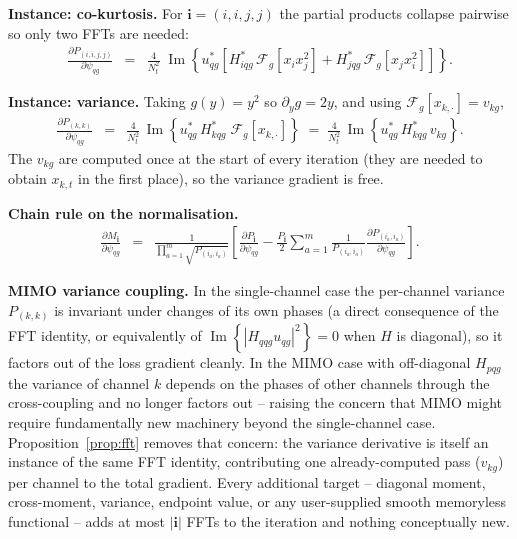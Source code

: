 \documentclass[10pt,a4paper]{article}
\numberwithin{equation}{section}
\newcommand{\block}[1]{\left[#1\right]}
\newcommand{\mat}[1]{\left(#1\right)}
\newcommand{\im}[1]{\operatorname{Im}\left\{#1\right\}}
\begin{document}
\textbf{Instance: co-kurtosis.} For $\mathbf{i}=(i,i,j,j)$ the partial products collapse pairwise so only two FFTs are needed:
\begin{eqnarray}
\frac{\partial P_{(i,i,j,j)}}{\partial \psi_{q g}} &=& \frac{4}{N_t^2}\;\im{u_{q g}^*\block{H_{i q g}^*\,\mathcal{F}_g\block{x_i x_j^2} + H_{j q g}^*\,\mathcal{F}_g\block{x_j x_i^2}}}.
\end{eqnarray}

\textbf{Instance: variance.} Taking $g\mat{y} = y^2$ so $\partial_y g = 2 y$, and using $\mathcal{F}_g\block{x_{k,\cdot}} = v_{k g}$,
\begin{eqnarray}
\frac{\partial P_{(k,k)}}{\partial \psi_{q g}}
	&=& \frac{4}{N_t^2}\,\im{u_{q g}^*\, H_{k q g}^*\;\mathcal{F}_g\block{x_{k,\cdot}}}
	\;=\; \frac{4}{N_t^2}\,\im{u_{q g}^*\, H_{k q g}^*\, v_{k g}}.
\end{eqnarray}
The $v_{k g}$ are computed once at the start of every iteration (they are needed to obtain $x_{k,t}$ in the first place), so the variance gradient is free.

\textbf{Chain rule on the normalisation.}
\begin{eqnarray}
\frac{\partial M_\mathbf{i}}{\partial \psi_{q g}}
	&=& \frac{1}{\prod_{a=1}^{m}\sqrt{P_{(i_a,i_a)}}}
	\block{\frac{\partial P_\mathbf{i}}{\partial \psi_{q g}}
	- \frac{P_\mathbf{i}}{2}\sum_{a=1}^{m}\frac{1}{P_{(i_a,i_a)}}\frac{\partial P_{(i_a,i_a)}}{\partial \psi_{q g}}}.
\end{eqnarray}

\textbf{MIMO variance coupling.} In the single-channel case the per-channel variance $P_{(k,k)}$ is invariant under changes of its own phases (a direct consequence of the FFT identity, or equivalently of $\im{|H_{q q g}u_{q g}|^2}=0$ when $H$ is diagonal), so it factors out of the loss gradient cleanly. In the MIMO case with off-diagonal $H_{p q g}$ the variance of channel $k$ depends on the phases of other channels through the cross-coupling and no longer factors out -- raising the concern that MIMO might require fundamentally new machinery beyond the single-channel case. Proposition~\ref{prop:fft} removes that concern: the variance derivative is itself an instance of the same FFT identity, contributing one already-computed pass ($v_{k g}$) per channel to the total gradient. Every additional target -- diagonal moment, cross-moment, variance, endpoint value, or any user-supplied smooth memoryless functional -- adds at most $|\mathbf{i}|$ FFTs to the iteration and nothing conceptually new.
\end{document}
